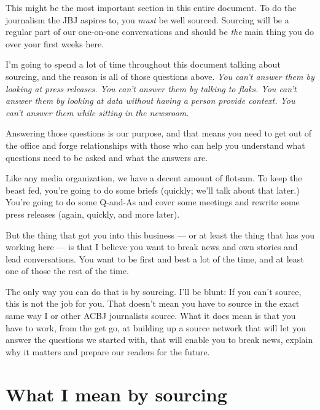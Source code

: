 \documentclass[
  11pt,
  american,
  letterpaperpaper,
  extrafontsizes,onecolumn,openright
  ]{memoir}
\begin{document}
\leavevmode{}%
\begin{greybox}[frametitle=Onboarding Path]
This might be the most important section in this entire document. To do the journalism the JBJ aspires to, you \emph{must} be well sourced. Sourcing will be a regular part of our one-on-one conversations and should be \emph{the} main thing you do over your first weeks here.

\end{greybox}

I'm going to spend a lot of time throughout this document talking about sourcing, and the reason is all of those questions above. \emph{You can't answer them by looking at press releases. You can't answer them by talking to flaks. You can't answer them by looking at data without having a person provide context. You can't answer them while sitting in the newsroom.}

Answering those questions is our purpose, and that means you need to get out of the office and forge relationships with those who can help you understand what questions need to be asked and what the answers are.

Like any media organization, we have a decent amount of flotsam. To keep the beast fed, you're going to do some briefs (quickly; we'll talk about that later.) You're going to do some Q-and-As and cover some meetings and rewrite some press releases (again, quickly, and more later).

But the thing that got you into this business --- or at least the thing that has you working here --- is that I believe you want to break news and own stories and lead conversations. You want to be first and best a lot of the time, and at least one of those the rest of the time.

The only way you can do that is by sourcing. I'll be blunt: If you can't source, this is not the job for you. That doesn't mean you have to source in the exact same way I or other ACBJ journalists source. What it does mean is that you have to work, from the get go, at building up a source network that will let you answer the questions we started with, that will enable you to break news, explain why it matters and prepare our readers for the future.

\hypertarget{what-i-mean-by-sourcing}{%
\section*{What I mean by sourcing}\label{what-i-mean-by-sourcing}}
\end{document}
